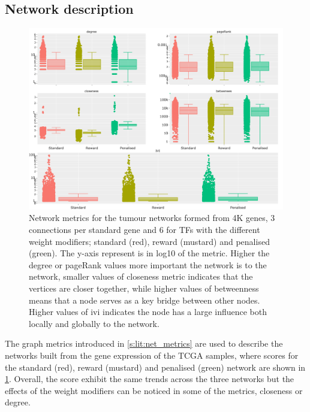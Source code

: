 \subsection{Network description} \label{s:N_I:tum_describe}

\begin{figure}[!t]  
\centering
\includegraphics[width=1.0\textwidth,keepaspectratio]{Sections/Network_I/Resources/Tum_network/NetworkMetricsComp_6TF.png}
    \caption{Network metrics for the tumour networks formed from 4K genes, 3 connections per standard gene and 6 for TFs with the different weight modifiers; standard (red), reward (mustard) and penalised (green). The y-axis represent is in log10 of the metric. Higher the degree or pageRank values more important the network is to the network, smaller values of closeness metric indicates that the vertices are closer together, while higher values of betweenness means that a node serves as a key bridge between other nodes. Higher values of \acrfull{ivi} indicates the node has a large influence both locally and globally to the network.}
    \label{fig:N_I:net_metrics_tum}
\end{figure}

The graph metrics introduced in \cref{s:lit:net_metrics} are used to describe the networks built from the gene expression of the TCGA samples, where scores for the standard (red), reward (mustard) and penalised (green) network are shown in \cref{fig:N_I:net_metrics_tum}. Overall, the score exhibit the same trends across the three networks but the effects of the weight modifiers can be noticed in some of the metrics, closeness or degree.


